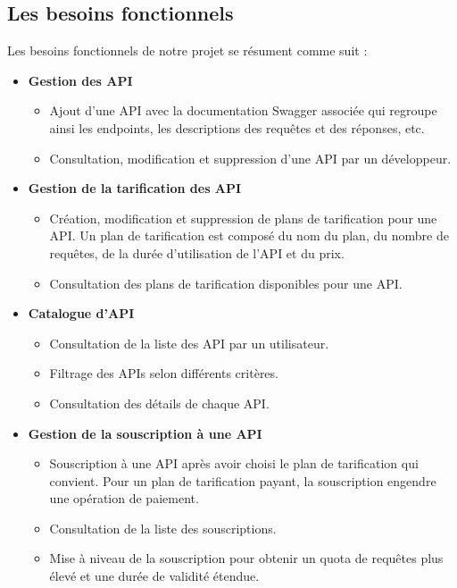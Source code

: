 \subsection{Les besoins fonctionnels }
Les besoins fonctionnels de notre projet se résument comme suit :
\begin{itemize}
    \item  \textbf{Gestion des API}
          \begin{itemize}
              \item Ajout d’une API avec la documentation Swagger associée qui regroupe ainsi les endpoints, les descriptions des requêtes et des réponses, etc.
              \item Consultation, modification et suppression d'une API par un développeur.
          \end{itemize}
    \item \textbf{Gestion de la tarification des API}
          \begin{itemize}
              \item Création, modification et suppression de plans de tarification pour une API. Un plan de tarification est composé du nom du plan, du nombre de requêtes, de la durée d'utilisation de l'API et du prix.
              \item Consultation des plans de tarification disponibles pour une API.
          \end{itemize}
    \item \textbf{Catalogue d’API}
          \begin{itemize}
              \item Consultation de la liste des API par un utilisateur.
              \item Filtrage des APIs selon différents critères.
              \item Consultation des détails de chaque API.
          \end{itemize}
    \item \textbf{Gestion de la souscription à une API}
          \begin{itemize}
              \item Souscription à une API après avoir choisi le plan de tarification qui convient. Pour un plan de tarification payant, la souscription engendre une opération de paiement.
              \item Consultation de la liste des souscriptions.
              \item Mise à niveau de la souscription pour obtenir un quota de requêtes plus élevé et une durée de validité étendue.

\end{itemize}
\end{itemize}
